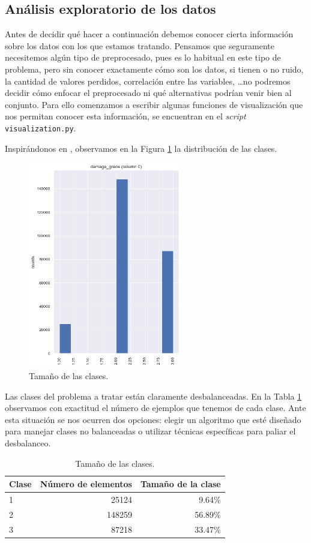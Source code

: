 \documentclass[a4paper, 20pt]{article}
\begin{document}
\subsection{Análisis exploratorio de los datos}

Antes de decidir qué hacer a continuación debemos conocer cierta información sobre los datos con los que estamos tratando. Pensamos que seguramente necesitemos algún tipo de preprocesado, pues es lo habitual en este tipo de problema, pero sin conocer exactamente cómo son los datos, si tienen o no ruido, la cantidad de valores perdidos, correlación entre las variables, \dots no podremos decidir cómo enfocar el preprocesado ni qué alternativas podrían venir bien al conjunto. Para ello comenzamos a escribir algunas funciones de visualización que nos permitan conocer esta información, se encuentran en el \textit{script} \texttt{visualization.py}.

Inspirándonos en \cite{noauthor_starter:_nodate}, observamos en la Figura \ref{fig:tam_clases} la distribución de las clases.

\begin{figure}[H]
    \centering
    \includegraphics[height=0.6\textwidth, width=0.6\textwidth]{260601_dist}
    \caption{Tamaño de las clases.}
    \label{fig:tam_clases}
\end{figure}

Las clases del problema a tratar están claramente desbalanceadas. En la Tabla \ref{tab:tam_clas} observamos con exactitud el número de ejemplos que tenemos de cada clase. Ante esta situación se nos ocurren dos opciones: elegir un algoritmo que esté diseñado para manejar clases no balanceadas o utilizar técnicas específicas para paliar el desbalanceo.

\begin{table}[H]
\centering
\caption{Tamaño de las clases.}
\label{tab:tam_clas}
\begin{tabular}{lrr}
\toprule
Clase & Número de elementos & Tamaño de la clase\\
\midrule
1 & 25124 & 9.64\%\\
2 & 148259 & 56.89\%\\
3 & 87218 & 33.47\%\\
\bottomrule
\end{tabular}
\end{table}
\end{document}
